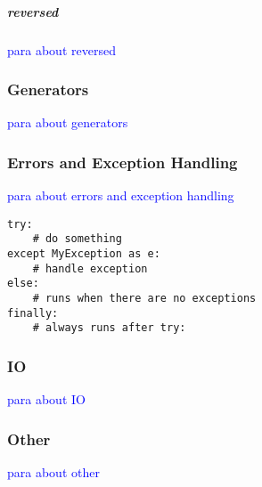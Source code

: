 \subparagraph{reversed}

\textcolor{blue}{para about reversed}

\subsubsection{Generators}

\textcolor{blue}{para about generators}

\subsubsection{Errors and Exception Handling}

\textcolor{blue}{para about errors and exception handling}

\begin{lstlisting}[style=pyInStyle]
try:
    # do something
except MyException as e:
    # handle exception
else:
    # runs when there are no exceptions
finally:
    # always runs after try:
\end{lstlisting}

\subsubsection{IO}

\textcolor{blue}{para about IO}

\subsubsection{Other}

\textcolor{blue}{para about other}


